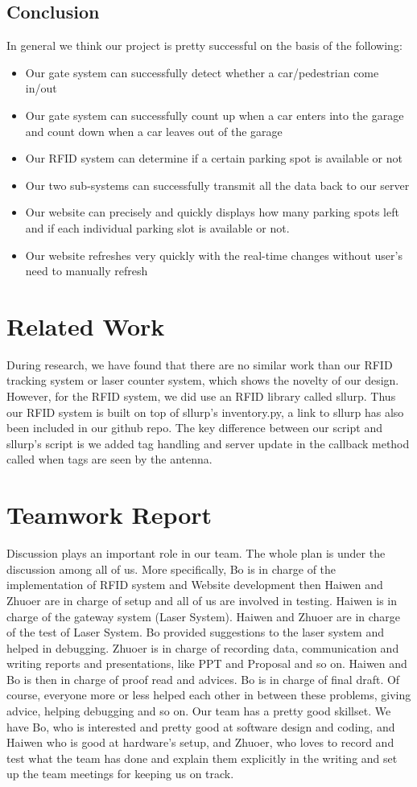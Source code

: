 \documentclass[12pt, a4paper]{article}
\begin{document}
\subsection{Conclusion}
In general we think our project is pretty successful on the basis of the following:
\begin{itemize}
	\item Our gate system can successfully detect whether a car/pedestrian come in/out
	\item Our gate system can successfully count up when a car enters into the garage and count down when a car leaves out of the garage
	\item Our RFID system can determine if a certain parking spot is available or not
	\item Our two sub-systems can successfully transmit all the data back to our server
	\item Our website can precisely and quickly displays how many parking spots left and if each individual parking slot is available or not.
	\item Our website refreshes very quickly with the real-time changes without user's need to manually refresh
\end{itemize}
\section{Related Work}
\label{sec:sllurp}
During research, we have found that there are no similar work than our RFID tracking system or laser counter system, which shows the novelty of our design. However, for the RFID system, we did use an RFID library called sllurp. Thus our RFID system is built on top of sllurp's inventory.py, a link to sllurp has also been included in our github repo. The key difference between our script and sllurp's script is we added tag handling and server update in the callback method called when tags are seen by the antenna.
\section{Teamwork Report}
Discussion plays an important role in our team. The whole plan is under the discussion among all of us. More specifically, Bo is in charge of the implementation of RFID system and Website development then Haiwen and Zhuoer are in charge of setup and all of us are involved in testing. Haiwen is in charge of the gateway system (Laser System). Haiwen and Zhuoer are in charge of the test of Laser System. Bo provided suggestions to the laser system and helped in debugging. Zhuoer is in charge of recording data, communication and writing reports and presentations, like PPT and Proposal and so on. Haiwen and Bo is then in charge of proof read and advices. Bo is in charge of final draft. Of course, everyone more or less helped each other in between these problems, giving advice, helping debugging and so on. Our team has a pretty good skillset. We have Bo, who is interested and pretty good at software design and coding, and Haiwen who is good at hardware’s setup, and Zhuoer, who loves to record and test what the team has done and explain them explicitly in the writing and set up the team meetings for keeping us on track.
\newpage
\appendix
\end{document}
